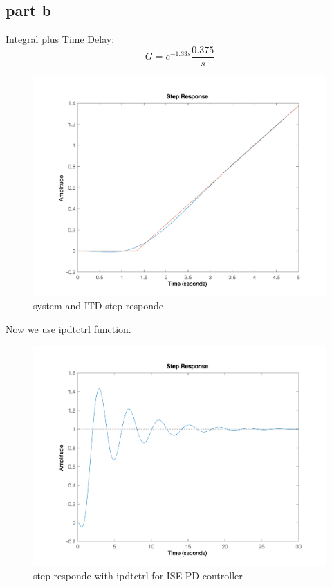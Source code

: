 \subsection{part b}
Integral plus Time Delay:
$$
G = e^{-1.33s}\dfrac{0.375}{s}      
$$
\begin{figure}[H]
    \caption{system and ITD step responde}
    \centering
    \includegraphics[width=12cm]{../Figure/Q2/IDT2.png}
\end{figure}
Now we use ipdtctrl function.
\begin{figure}[H]
    \caption{step responde with ipdtctrl for ISE PD controller}
    \centering
    \includegraphics[width=12cm]{../Figure/Q2/pd1.png}
\end{figure}
